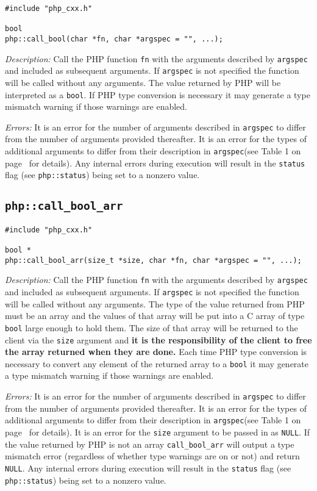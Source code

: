\documentclass[11pt,titlepage]{article}
\begin{document}
\begin{verbatim}
#include "php_cxx.h"

bool 
php::call_bool(char *fn, char *argspec = "", ...);
\end{verbatim}

\emph{Description:} Call the PHP function \verb|fn| with the arguments described by \verb|argspec| and included as subsequent arguments. If \verb|argspec| is not specified the function will be called without any arguments. The value returned by PHP will be interpreted as a \verb|bool|. If PHP type conversion is necessary it may generate a type mismatch warning if those warnings are enabled.

\emph{Errors:} It is an error for the number of arguments described in \verb|argspec| to differ from the number of arguments provided thereafter. It is an error for the types of additional arguments to differ from their description in \verb|argspec|(see Table 1 on page~\pageref{Table1} for details). Any internal errors during execution will result in the \verb|status| flag (see \verb|php::status|) being set to a nonzero value.


\subsection{\texttt{php::call\_bool\_arr}}

\begin{verbatim}
#include "php_cxx.h"

bool *
php::call_bool_arr(size_t *size, char *fn, char *argspec = "", ...);
\end{verbatim}

\emph{Description:} Call the PHP function \verb|fn| with the arguments described by \verb|argspec| and included as subsequent arguments. If \verb|argspec| is not specified the function will be called without any arguments. The type of the value returned from PHP must be an array and the values of that array will be put into a C array of type \verb|bool| large enough to hold them. The size of that array will be returned to the client via the \verb|size| argument and \textbf{it is the responsibility of the client to free the array returned when they are done.} Each time PHP type conversion is necessary to convert any element of the returned array to a \verb|bool| it may generate a type mismatch warning if those warnings are enabled.

\emph{Errors:} It is an error for the number of arguments described in \verb|argspec| to differ from the number of arguments provided thereafter. It is an error for the types of additional arguments to differ from their description in \verb|argspec|(see Table 1 on page~\pageref{Table1} for details). It is an error for the \verb|size| argument to be passed in as \verb|NULL|. If the value returned by PHP is not an array \verb|call_bool_arr| will output a type mismatch error (regardless of whether type warnings are on or not) and  return \verb|NULL|. Any internal errors during execution will result in the \verb|status| flag (see \verb|php::status|) being set to a nonzero value.
\end{document}
